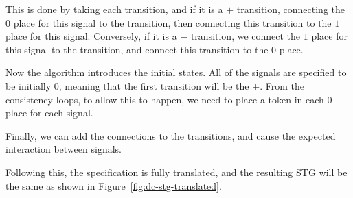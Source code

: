 \documentclass[british,conference,compsoc]{IEEEtran}
\begin{document}
This is done by taking each transition, and if it is a $+$ transition, 
connecting the $0$ place for this signal to the transition, then connecting 
this transition to the $1$ place for this signal. Conversely, if it is a $-$ 
transition, we connect the $1$ place for this signal to the transition, and 
connect this transition to the $0$ place.

Now the algorithm introduces the initial states. All of the signals are 
specified to be initially 0, meaning that the first transition will be the $+$.
From the consistency loops, to allow this to happen, we need to place a token 
in each $0$ place for each signal.

Finally, we can add the connections to the transitions, and cause the 
expected interaction between signals. 


Following this, the specification is fully translated, and the resulting STG 
will be the same as shown in Figure~\ref{fig:dc-stg-translated}.
\end{document}
